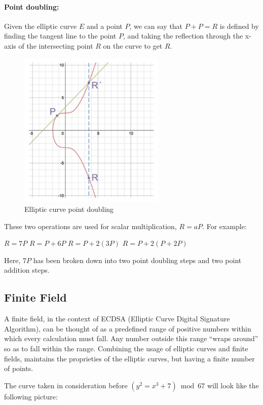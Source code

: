 \documentclass{article}
\begin{document}
\paragraph{Point doubling:} Given the elliptic curve \(E\) and a point \(P\), we can say that \(P + P = R\) is defined by finding the tangent line to the point \(P\), and taking the reflection through the x-axis of the intersecting point \(R\) on the curve to get \(R\).

\begin{figure}[H]
    \centering
    \includegraphics[width=7cm]{images/4.png}
    \caption{Elliptic curve point doubling}
\end{figure}

\noindent These two operations are used for scalar multiplication, \(R = aP\). For example:
\begin{adjustwidth}{2.5em}{0pt}
    \(R = 7P\)\newline
    \(R = P + 6P\)\newline
    \(R = P + 2 (3P)\)\newline
    \(R = P + 2 (P + 2P)\)
\end{adjustwidth}
Here, \(7P\) has been broken down into two point doubling steps and two point addition steps.

\subsection*{Finite Field}
A finite field, in the context of ECDSA (Elliptic Curve Digital Signature Algorithm), can be thought of as a predefined range of positive numbers within which every calculation must fall. Any number outside this range “wraps around” so as to fall within the range.\newline
Combining the usage of elliptic curves and finite fields, maintains the proprieties of the elliptic curves, but having a finite number of points.\par 
\noindent The curve taken in consideration before \((y^2 = x^3 + 7) \bmod 67\) will look like the following picture:
\end{document}
